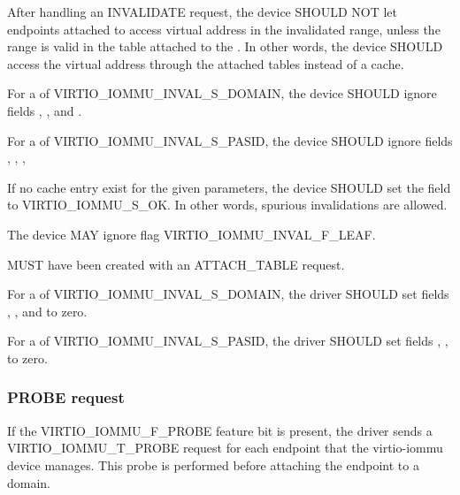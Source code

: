 
After handling an INVALIDATE request, the device SHOULD NOT let
endpoints attached to  access virtual address in
the invalidated range, unless the range is valid in the table
attached to the . In other words, the device SHOULD
access the virtual address through the attached tables instead of
a cache.

For a  of VIRTIO_IOMMU_INVAL_S_DOMAIN, the device
SHOULD ignore fields , ,
 and .

For a  of VIRTIO_IOMMU_INVAL_S_PASID, the device
SHOULD ignore fields , ,
,

If no cache entry exist for the given parameters, the device
SHOULD set the  field to VIRTIO_IOMMU_S_OK. In
other words, spurious invalidations are allowed.

The device MAY ignore flag VIRTIO_IOMMU_INVAL_F_LEAF.


 MUST have been created with an ATTACH_TABLE
request.

For a  of VIRTIO_IOMMU_INVAL_S_DOMAIN, the driver
SHOULD set fields , ,
 and  to zero.

For a  of VIRTIO_IOMMU_INVAL_S_PASID, the driver
SHOULD set fields , ,
 to zero.

\subsubsection{PROBE request}\label{sec:Device Types / IOMMU Device / Device operations / PROBE request}

If the VIRTIO_IOMMU_F_PROBE feature bit is present, the driver sends a
VIRTIO_IOMMU_T_PROBE request for each endpoint that the virtio-iommu
device manages. This probe is performed before attaching the endpoint to
a domain.

